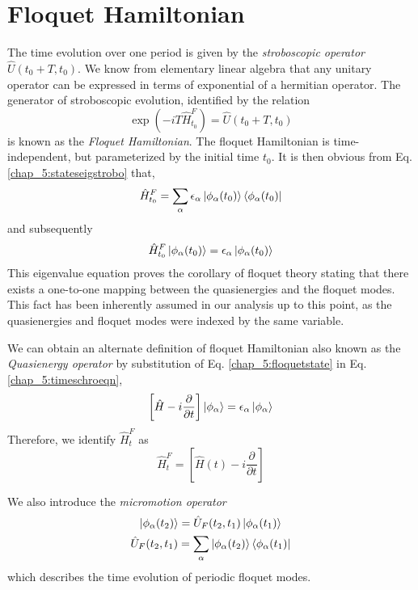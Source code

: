 \section{Floquet Hamiltonian}
The time evolution over one period is given by the \emph{stroboscopic operator} $\hat{U}(t_0 + T, t_0)$. We know from elementary linear algebra that any unitary operator can
be expressed in terms of exponential of a hermitian operator. The generator of stroboscopic evolution, identified by the relation
\begin{equation}
 \exp\left(-iT\hat{H}_{t_0}^{F}\right) = \hat{U}(t_0 + T, t_0)
\end{equation} is known as the \emph{Floquet Hamiltonian}. The floquet Hamiltonian is time-independent, but parameterized by the initial time $t_0$.
It is then obvious from Eq. \eqref{chap_5:stateseigstrobo} that,
\begin{equation*}
 \hat{H}_{t_0}^{F} = \sum_{\alpha}{\epsilon_\alpha \ket{\phi_\alpha (t_0)}\bra{\phi_\alpha (t_0)}}
\end{equation*} and subsequently 
\begin{equation}
 \hat{H}_{t_0}^{F}\ket{\phi_\alpha (t_0)} = \epsilon_\alpha \ket{\phi_\alpha (t_0)}
\end{equation} This eigenvalue equation proves the corollary of floquet theory stating that there exists a one-to-one mapping between the quasienergies and the floquet modes. 
This fact has been inherently assumed in our analysis up to this point, as the quasienergies and floquet modes were indexed by the same variable.

We can obtain an alternate definition of floquet Hamiltonian also known as the \emph{Quasienergy operator} by substitution of Eq. \eqref{chap_5:floquetstate} in 
Eq. \eqref{chap_5:timeschroeqn},
\begin{equation}
  \left[\hat{H} - i\frac{\partial}{\partial t}\right]\ket{\phi_\alpha} = \epsilon_\alpha\ket{\phi_\alpha}
\end{equation} Therefore, we identify $\hat{H}_{t}^{F}$ as 
\begin{equation}
 \hat{H}_{t}^{F} = \left[\hat{H}(t) - i\frac{\partial}{\partial t}\right]
\end{equation}



We also introduce the \emph{micromotion operator} 
\begin{gather}
  \ket{\phi_\alpha (t_2)} = \hat{U}_{F}(t_2, t_1)\ket{\phi_\alpha (t_1)}\\
  \hat{U}_{F}(t_2, t_1) = \sum_{\alpha}{\ket{\phi_\alpha (t_2)}\bra{\phi_\alpha (t_1)}}
\end{gather} which describes the time evolution of periodic floquet modes.

